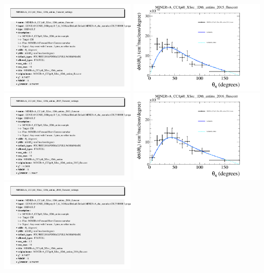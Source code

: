 \documentclass{article}
\begin{document}
\includegraphics[width=0.49\textwidth]{figures/nuisance_MINERvA_CC1pi0_XSec_1Dth_antinu_fluxcorr_info.png}
\centering
\includegraphics[width=0.49\textwidth]{figures/nuisance_MINERvA_CC1pi0_XSec_1Dth_antinu_2015_fluxcorr_comp.png}
\includegraphics[width=0.49\textwidth]{figures/nuisance_MINERvA_CC1pi0_XSec_1Dth_antinu_2015_fluxcorr_info.png}
\centering
\includegraphics[width=0.49\textwidth]{figures/nuisance_MINERvA_CC1pi0_XSec_1Dth_antinu_2016_fluxcorr_comp.png}
\includegraphics[width=0.49\textwidth]{figures/nuisance_MINERvA_CC1pi0_XSec_1Dth_antinu_2016_fluxcorr_info.png}
\end{document}
